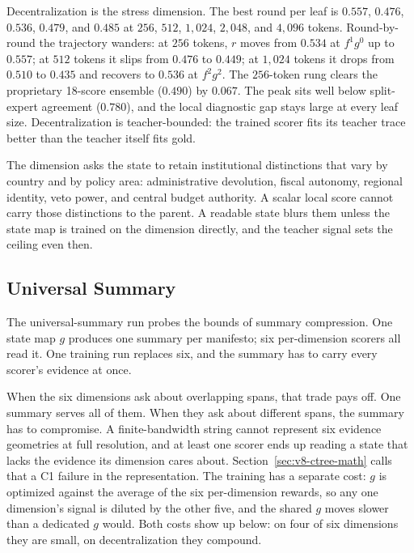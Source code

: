 Decentralization is the stress dimension. The best round per leaf
is \(0.557\), \(0.476\), \(0.536\), \(0.479\), and \(0.485\) at
\(256\), \(512\), \(1{,}024\), \(2{,}048\), and \(4{,}096\) tokens.
Round-by-round the trajectory wanders: at \(256\) tokens, \(r\) moves
from \(0.534\) at \(f^1g^0\) up to \(0.557\); at \(512\) tokens it
slips from \(0.476\) to \(0.449\); at \(1{,}024\) tokens it drops
from \(0.510\) to \(0.435\) and recovers to \(0.536\) at \(f^2g^2\).
The \(256\)-token rung clears the proprietary 18-score ensemble
(\(0.490\)) by \(0.067\). The peak sits well below split-expert
agreement (\(0.780\)), and the local diagnostic gap stays large at
every leaf size. Decentralization is teacher-bounded: the trained
scorer fits its teacher trace better than the teacher itself fits
gold.

The dimension asks the state to retain institutional distinctions
that vary by country and by policy area: administrative devolution,
fiscal autonomy, regional identity, veto power, and central budget
authority. A scalar local score cannot carry those distinctions to
the parent. A readable state blurs them unless the state map is
trained on the dimension directly, and the teacher signal sets the
ceiling even then.

\subsection{Universal Summary}\label{sec:v8-benoit-universal-summary}

The universal-summary run probes the bounds of summary compression.
One state map \(g\) produces one summary per manifesto; six
per-dimension scorers all read it. One training run replaces six,
and the summary has to carry every scorer's evidence at once.

When the six dimensions ask about overlapping spans, that trade
pays off. One summary serves all of them. When they ask about
different spans, the summary has to compromise. A finite-bandwidth
string cannot represent six evidence geometries at full resolution,
and at least one scorer ends up reading a state that lacks the
evidence its dimension cares about. Section~\ref{sec:v8-ctree-math}
calls that a C1 failure in the representation. The training has a
separate cost: \(g\) is optimized against the average of the six
per-dimension rewards, so any one dimension's signal is diluted by
the other five, and the shared \(g\) moves slower than a dedicated
\(g\) would. Both costs show up below: on four of six dimensions
they are small, on decentralization they compound.

